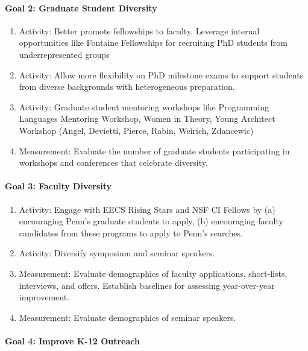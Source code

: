 \paragraph*{Goal 2: Graduate Student Diversity}
\begin{enumerate}
\item Activity: Better promote fellowships to faculty. Leverage internal opportunities like Fontaine Fellowships for recruiting PhD students from underrepresented groups
\item Activity: Allow more flexibility on PhD milestone exams to support students from diverse backgrounds with heterogeneous preparation.
\item Activity: Graduate student mentoring workshops like Programming Languages Mentoring Workshop, Women in Theory, Young Architect Workshop (Angel, Devietti, Pierce, Rabin, Weirich, Zdancewic)
\item Measurement: Evaluate the number of graduate students participating in workshops and conferences that celebrate diversity.
\end{enumerate}

\paragraph*{Goal 3: Faculty Diversity}

\begin{enumerate}
\item Activity: Engage with EECS Rising Stars and NSF CI Fellows by (a) encouraging Penn’s graduate students to apply, (b) encouraging faculty candidates from these programs to apply to Penn's searches.
\item Activity: Diversify symposium and seminar speakers.
\item Measurement: Evaluate demographics of faculty applications, short-lists, interviews, and offers. Establish baselines for assessing year-over-year improvement.
\item Measurement: Evaluate demographics of seminar speakers.
\end{enumerate}

\paragraph*{Goal 4: Improve K-12 Outreach}

